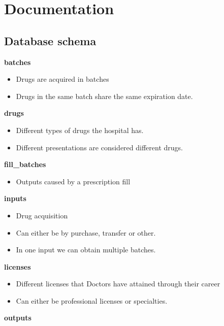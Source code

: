 \hypertarget{documentation}{%
\section{Documentation}\label{documentation}}

\hypertarget{database-schema}{%
\subsection{Database schema}\label{database-schema}}

\textbf{batches}

\begin{itemize}
\item
  Drugs are acquired in batches
\item
  Drugs in the same batch share the same expiration date.
\end{itemize}

\textbf{drugs}

\begin{itemize}
\item
  Different types of drugs the hospital has.
\item
  Different presentations are considered different drugs.
\end{itemize}

\textbf{fill\_batches}

\begin{itemize}
\tightlist
\item
  Outputs caused by a prescription fill
\end{itemize}

\textbf{inputs}

\begin{itemize}
\item
  Drug acquisition
\item
  Can either be by purchase, transfer or other.
\item
  In one input we can obtain multiple batches.
\end{itemize}

\textbf{licenses}

\begin{itemize}
\item
  Different licenses that Doctors have attained through their career
\item
  Can either be professional licenses or specialties.
\end{itemize}

\textbf{outputs}

